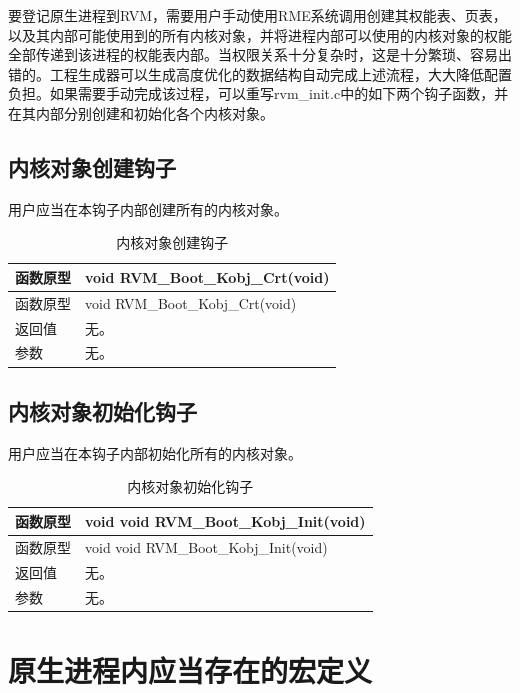 要登记原生进程到RVM，需要用户手动使用RME系统调用创建其权能表、页表，以及其内部可能使用到的所有内核对象，并将进程内部可以使用的内核对象的权能全部传递到该进程的权能表内部。当权限关系十分复杂时，这是十分繁琐、容易出错的。工程生成器可以生成高度优化的数据结构自动完成上述流程，大大降低配置负担。如果需要手动完成该过程，可以重写rvm\_init.c中的如下两个钩子函数，并在其内部分别创建和初始化各个内核对象。

\subsection{内核对象创建钩子}\label{subsec:3-3-1}

用户应当在本钩子内部创建所有的内核对象。

\begin{xltabular}{\textwidth}{@{}>{\hsize\raggedright\arraybackslash}X>{\hsize\raggedright\arraybackslash}X@{}}
\caption{内核对象创建钩子}\label{tab:3-2}\\
\toprule
函数原型 & void RVM\_\allowbreak{}Boot\_\allowbreak{}Kobj\_\allowbreak{}Crt(void)\tabularnewline
\endfirsthead
\toprule
函数原型 & void RVM\_\allowbreak{}Boot\_\allowbreak{}Kobj\_\allowbreak{}Crt(void)\tabularnewline
\midrule
\endhead
\bottomrule
\endlastfoot
返回值 & 无。\tabularnewline
参数 & 无。\tabularnewline
\end{xltabular}

\subsection{内核对象初始化钩子}\label{subsec:3-3-2}

用户应当在本钩子内部初始化所有的内核对象。

\begin{xltabular}{\textwidth}{@{}>{\hsize\raggedright\arraybackslash}X>{\hsize\raggedright\arraybackslash}X@{}}
\caption{内核对象初始化钩子}\label{tab:3-3}\\
\toprule
函数原型 & void void RVM\_\allowbreak{}Boot\_\allowbreak{}Kobj\_\allowbreak{}Init(void)\tabularnewline
\endfirsthead
\toprule
函数原型 & void void RVM\_\allowbreak{}Boot\_\allowbreak{}Kobj\_\allowbreak{}Init(void)\tabularnewline
\midrule
\endhead
\bottomrule
\endlastfoot
返回值 & 无。\tabularnewline
参数 & 无。\tabularnewline
\end{xltabular}

\section{原生进程内应当存在的宏定义}\label{sec:3-4}

